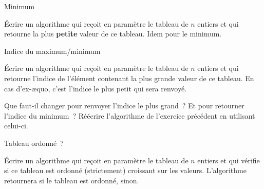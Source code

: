 	\begin{Exercice}{Minimum}
		
		Écrire un algorithme qui reçoit en paramètre le tableau
		 de $n$ entiers et qui
		retourne la plus \textbf{petite} valeur de ce tableau. Idem pour le minimum.
	\end{Exercice}
	
	\begin{Exercice}{Indice du maximum/minimum}
		\label{ex:indiceminmax}
		
		Écrire un algorithme qui reçoit en paramètre 
		le tableau  de $n$ entiers 
		et qui retourne l’indice de l’élément contenant 
		la plus grande valeur de ce tableau. 
		En cas d’ex-æquo, c’est l’indice le plus petit qui sera renvoyé.
		
		Que faut-il changer pour renvoyer l’indice le plus grand~?
		Et pour retourner l’indice du minimum~? 
		Réécrire l’algorithme de l’exercice précédent en utilisant celui-ci.
	\end{Exercice}
		
	\begin{Exercice}{Tableau ordonné~?}
		
		Écrire un algorithme qui reçoit en paramètre 
		le tableau  de $n$ entiers 
		et qui vérifie si ce tableau est ordonné 
		(strictement) croissant sur les valeurs. 
		L’algorithme retournera  si le tableau est ordonné,
		 sinon.
	\end{Exercice}
	
